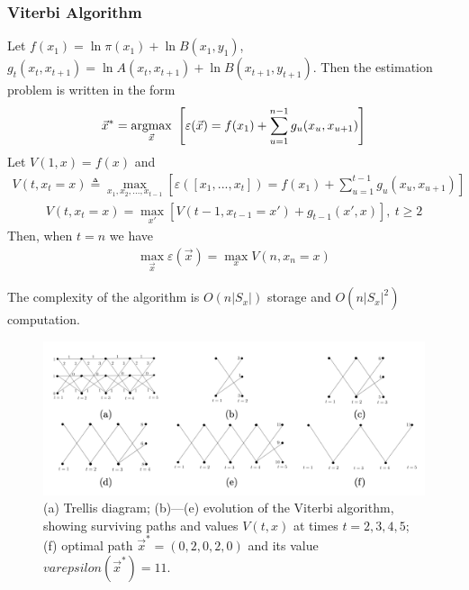 \documentclass[11pt,a4paper]{article}
\newcommand{\argmax}{\operatornamewithlimits{argmax}}
\begin{document}
\subsubsection{Viterbi Algorithm}
Let $f(x_1)=\ln\pi(x_1)+\ln B(x_1,y_1)$, $g_t(x_t,x_{t+1})=\ln A(x_t,x_{t+1})+\ln B(x_{t+1},y_{t+1})$. Then the estimation problem is written in the form
\begin{equation}
    \begin{aligned}
        \vec{x}^*=\argmax_{\vec{x}}\ \left[\varepsilon (\vec{x})=f(x_1)+\sum_{u=1}^{n-1}g_u(x_u,x_{u+1})\right]
    \end{aligned}
    \nonumber
\end{equation}
Let $V(1,x)=f(x)$ and
\begin{equation}
    \begin{aligned}
        V(t,x_t=x)\triangleq \max_{x_1,x_2,...,x_{t-1}}\left[\varepsilon([x_1,...,x_t])=f(x_1)+\sum_{u=1}^{t-1}g_u(x_u,x_{u+1})\right]
    \end{aligned}
    \nonumber
\end{equation}
\begin{equation}
    \begin{aligned}
        V(t,x_t=x)=\max_{x'} \left[V(t-1,x_{t-1}=x')+g_{t-1}(x',x)\right],\ t\geq 2
    \end{aligned}
    \nonumber
\end{equation}
Then, when $t=n$ we have
\begin{equation}
    \begin{aligned}
        \max_{\vec{x}}\varepsilon(\vec{x})=\max_{x} V(n,x_n=x)
    \end{aligned}
    \nonumber
\end{equation}

The complexity of the algorithm is $O(n|S_x|)$ storage and $O(n|S_x|^2)$ computation.

\begin{center}\begin{figure}[htbp]
    \centering
    \includegraphics[scale=0.2]{dia.png}
    \caption{(a) Trellis diagram; (b)—(e) evolution of the Viterbi algorithm, showing surviving paths and values $V(t,x)$ at times $t = 2,3,4,5$; (f) optimal path $\vec{x}^* = (0,2,0,2,0)$ and its value $varepsilon(\vec{x}^*) = 11$.}
    \label{}
\end{figure}\end{center}
\end{document}
